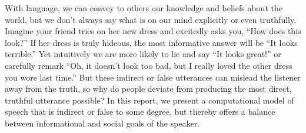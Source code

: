 \documentclass[12pt]{article}
\begin{document}


With language, we can convey to others our knowledge and beliefs about the world,
but we don't always say what is on our mind explicitly or even truthfully. 
Imagine your friend tries on her new dress and excitedly asks you, \enquote{How does this look?} 
If her dress is truly hideous, the most informative answer will be \enquote{It looks terrible.}
Yet intuitively we are more likely to lie and say \enquote{It looks great!}
or carefully remark \enquote{Oh, it doesn't look too bad, but I really loved the other dress you wore last time.}
But these indirect or false utterances can mislead the listener away from the truth,
so why do people deviate from producing the most direct, truthful utterance possible?
In this report, we present a computational model of speech that is indirect or false to some degree, 
but thereby offers a balance between informational and social goals of the speaker. 
\end{document}
